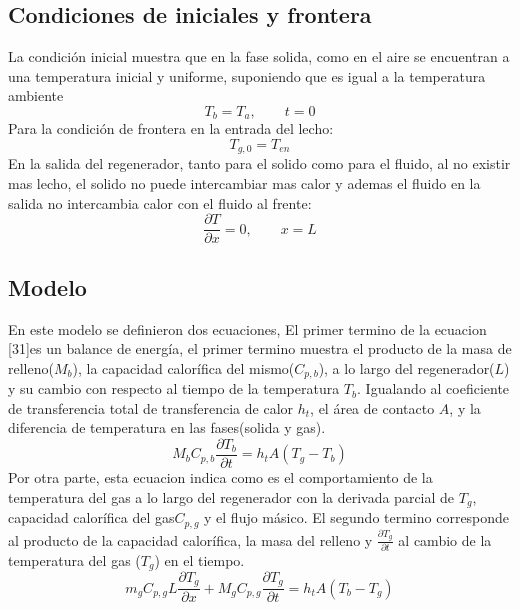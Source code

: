 \documentclass[12pt,letterpaper,final]{article}%
\begin{document}
\subsection{Condiciones de iniciales y frontera}
La condición inicial muestra que en la fase solida, como en el aire se encuentran a una temperatura inicial y uniforme, suponiendo que es igual a la temperatura ambiente
\begin{equation}
	T_b=T_a , \qquad t=0
\end{equation} 
Para la condición de frontera en la entrada del lecho:
\begin{equation}
	T_{g,0}=T_{en}
\end{equation}
En la salida del regenerador, tanto para el solido como para el fluido, al no existir mas lecho, el solido no puede intercambiar mas calor y ademas el fluido en la salida no intercambia calor con el fluido al frente:
\begin{equation}\label{Solido}
	\frac{\partial T}{\partial x} = 0, \qquad x=L
\end{equation}
\subsection{Modelo}
En este modelo se definieron dos ecuaciones, El primer termino de la ecuacion [31]es un balance de energía, el primer termino muestra el producto de la masa de relleno($M_b$), la capacidad calorífica del mismo($C_{p,b}$), a lo largo del regenerador($L$) y su cambio con respecto al tiempo de la temperatura $T_b$. Igualando al coeficiente de transferencia total de transferencia de calor $h_t$, el área de contacto $A$, y la diferencia de temperatura en las fases(solida y gas).
\begin{equation}\label{Gas}
	M_b C_{p,b}\frac{\partial T_b}{\partial t} = h_t A (T_g - T_b) 
\end{equation}
Por otra parte, esta ecuacion indica como es el comportamiento de la temperatura del gas a lo largo del regenerador con la derivada parcial de $T_g$, capacidad calorífica del gas$C_{p,g}$ y el flujo másico. El segundo termino corresponde al producto de la capacidad calorífica, la masa del relleno y $\frac{\partial T_g}{\partial t}$ al cambio de la temperatura del gas ($T_g$) en el tiempo. 
\begin{equation}
	m_g C_{p,g} L \frac{\partial T_g}{\partial x} + M_g C_{p,g} \frac{\partial T_g}{\partial t} = h_t A (T_b - T_g) 
\end{equation}
\end{document}
